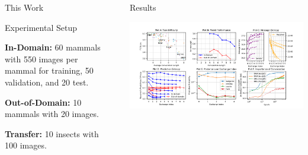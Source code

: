 \documentclass[final]{beamer}
\newlength{\sepwid}
\newlength{\onecolwid}
\newlength{\twocolwid}
\begin{document}
\begin{frame}[t]
\begin{columns}[t]
\begin{column}{\onecolwid}
\begin{block}{This Work}
\end{block}

\begin{block}{Experimental Setup}

\textbf{In-Domain:} 60 mammals with 550 images per mammal for training, 50 validation, and 20 test.

\textbf{Out-of-Domain:} 10 mammals with 20 images.

\textbf{Transfer:} 10 insects with 100 images.

\end{block}

\end{column} %


\begin{column}{\sepwid}\end{column} %

\begin{column}{\twocolwid} %

\begin{block}{Results}

\begin{minipage}{\textwidth}
\centering
\includegraphics[width=\textwidth]{figures/poster_figures.pdf}
\end{minipage}



\end{block}
\end{column}
\end{columns}
\end{frame}
\end{document}
